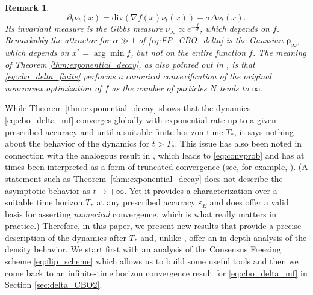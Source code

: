 \documentclass[reqno]{amsart}
\numberwithin{algorithm}{section}
\newcommand{\dv}{\mathrm{div}}
\newtheorem{remark}[theorem]{Remark}
\begin{document}
{\begin{remark}
$$
\partial_t \nu_t(x) = \dv\left( \nabla f(x) \nu_t(x)\right) +\sigma \Delta \nu_t(x).
$$
Its invariant measure is the Gibbs measure $\nu_\infty \propto e^{-\frac{f}{\sigma}}$, which depends on $f$. Remarkably the attractor for $\alpha\gg1$ of \eqref{eq:FP_CBO_delta} is the Gaussian $\boldsymbol\rho_\infty$, which depends on $x^* =\arg \min f$, but not on the entire function $f$. The meaning of Theorem \ref{thm:exponential_decay}, as also pointed out in \cite{B1-fornasier2021global}, is that \eqref{eq:cbo_delta_finite} performs a canonical convexification of the original nonconvex optimization of $f$ as the number of particles $N$ tends to $\infty$.
\end{remark}
While Theorem \ref{thm:exponential_decay} shows that the dynamics \eqref{eq:cbo_delta_mf} converges globally with exponential rate up to a given prescribed accuracy and until a suitable finite horizon time $T_*$, it says nothing about the behavior of the dynamics for $t> T_*$. This issue has also been noted in connection with the analogous result in \cite[Theorem~3.7]{B1-fornasier2021global}, which leads to \eqref{eq:convprob} and has at times been interpreted as a form of truncated convergence (see, for example, \cite{bianchi2025}). (A statement such as Theorem~\ref{thm:exponential_decay} does not describe the asymptotic behavior as $t\to +\infty$. Yet it provides a characterization over a suitable time horizon $T_*$ at any prescribed accuracy $\varepsilon_E$ and does offer a valid basis for asserting \emph{numerical} convergence, which is what really matters in practice.)
 Therefore, in this paper, we present new results that provide a precise description of the dynamics after $T_*$ and, unlike \cite{bianchi2025}, offer an in-depth analysis of the density behavior. We start first with an analysis of the Consensus Freezing scheme \eqref{eq:flip_scheme} which allows us to build some useful tools and then we come back to an infinite-time horizon convergence result for \eqref{eq:cbo_delta_mf} in Section \ref{sec:delta_CBO2}.



}
\end{document}
